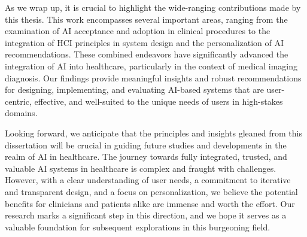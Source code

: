 As we wrap up, it is crucial to highlight the wide-ranging contributions made by this thesis.
This work encompasses several important areas, ranging from the examination of \ac{AI} acceptance and adoption in clinical procedures to the integration of \ac{HCI} principles in system design and the personalization of \ac{AI} recommendations.
These combined endeavors have significantly advanced the integration of \ac{AI} into healthcare, particularly in the context of medical imaging diagnosis.
Our findings provide meaningful insights and robust recommendations for designing, implementing, and evaluating \ac{AI}-based systems that are user-centric, effective, and well-suited to the unique needs of users in high-stakes domains.

Looking forward, we anticipate that the principles and insights gleaned from this dissertation will be crucial in guiding future studies and developments in the realm of \ac{AI} in healthcare.
The journey towards fully integrated, trusted, and valuable \ac{AI} systems in healthcare is complex and fraught with challenges.
However, with a clear understanding of user needs, a commitment to iterative and transparent design, and a focus on personalization, we believe the potential benefits for clinicians and patients alike are immense and worth the effort.
Our research marks a significant step in this direction, and we hope it serves as a valuable foundation for subsequent explorations in this burgeoning field.